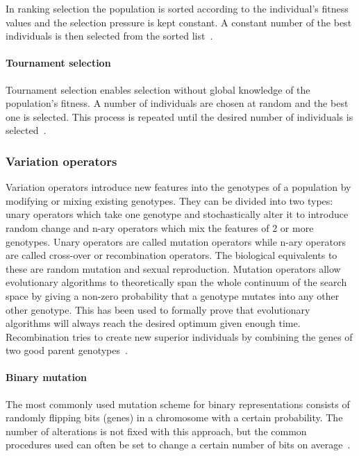 In ranking selection the population is sorted according to the individual's fitness values and the selection pressure is kept constant. A constant number of the best individuals is then selected from the sorted list~\cite{Eiben2015asdfasd}.

\paragraph{Tournament selection}

Tournament selection enables selection without global knowledge of the population's fitness. A number of individuals are chosen at random and the best one is selected. This process is repeated until the desired number of individuals is selected~\cite{Eiben2015asdfasd}.


\subsubsection{Variation operators}

Variation operators introduce new features into the genotypes of a population by modifying or mixing existing genotypes. They can be divided into two types: unary operators which take one genotype and stochastically alter it to introduce random change and n-ary operators which mix the features of 2 or more genotypes. Unary operators are called mutation operators while n-ary operators are called cross-over or recombination operators. The biological equivalents to these are random mutation and sexual reproduction. Mutation operators allow evolutionary algorithms to theoretically span the whole continuum of the search space by giving a non-zero probability that a genotype mutates into any other other genotype. This has been used to formally prove that evolutionary algorithms will always reach the desired optimum given enough time. Recombination tries to create new superior individuals by combining the genes of two good parent genotypes~\cite{Eiben2015_whatevolutionary, Eiben20021}.

\paragraph{Binary mutation}

The most commonly used mutation scheme for binary representations consists of randomly flipping bits (genes) in a chromosome with a certain probability. The number of alterations is not fixed with this approach, but the common procedures used can often be set to change a certain number of bits on average~\cite{Eiben201511}.

